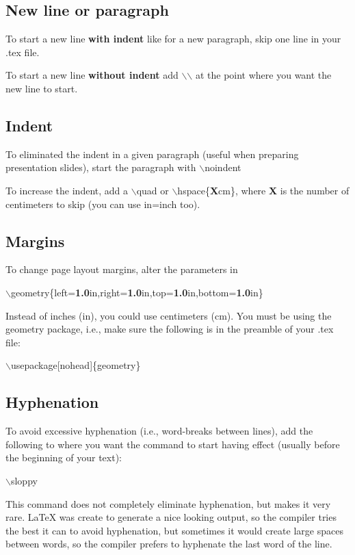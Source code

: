 \documentclass[12pt]{article}%
\begin{document}
\subsection{New line or paragraph}

To start a new line \textbf{with indent} like for a new paragraph, skip one line in your .tex file.

To start a new line \textbf{without indent} add $\backslash$$\backslash$ at the point where you want the new line to start. 

\subsection{Indent}

To eliminated the indent in a given paragraph (useful when preparing presentation slides), start the paragraph with
$\backslash$noindent

To increase the indent, add a $\backslash$quad or $\backslash$hspace\{\textbf{X}cm\}, where \textbf{X} is the number of centimeters to skip (you can use in=inch too).

\subsection{Margins}

To change page layout margins, alter the parameters in

	$\backslash$geometry\{left=\textbf{1.0}in,right=\textbf{1.0}in,top=\textbf{1.0}in,bottom=\textbf{1.0}in\}

Instead of inches (in), you could use centimeters (cm). You must be using the geometry package, i.e., make sure the following is in the preamble of your .tex file:

	$\backslash$usepackage[nohead]\{geometry\}

\subsection{Hyphenation}

To avoid excessive hyphenation (i.e., word-breaks between lines), add the following to where you want the command to start having effect (usually before the beginning of your text): 

$\backslash$sloppy 

This command does not completely eliminate hyphenation, but makes it very rare. 
LaTeX was create to generate a nice looking output, so the compiler tries the best it can to avoid hyphenation, but sometimes it would create large spaces between words, so the compiler prefers to hyphenate the last word of the line.
\end{document}
